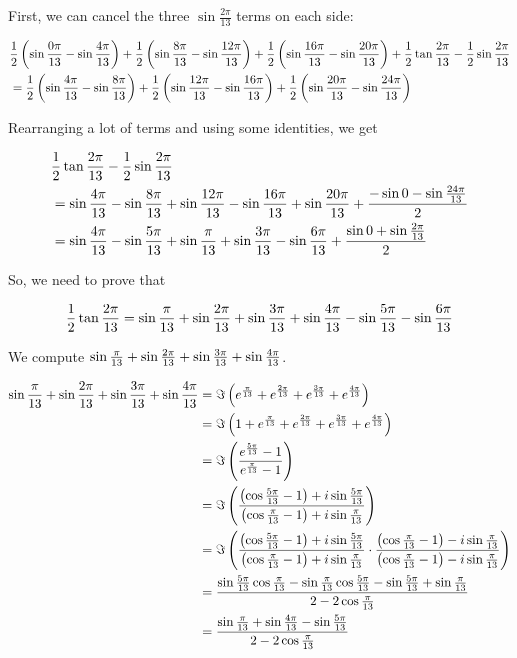 \documentclass[10pt]{../usamts}
\begin{document}
\begin{solution}{5}
First, we can cancel the three $\sin\frac{2\pi}{13}$ terms on each side:

\newcommand{\showsinsubtraction}[2] {
    \frac{1}{2}\paren{\sinthirteen{#1} - \sinthirteen{#2}}
}

\begin{align*}
    &\showsinsubtraction{0}{4} +
    \showsinsubtraction{8}{12} +
    \showsinsubtraction{16}{20} +
    \showtrianglebarea \\
    &=
    \showsinsubtraction{4}{8} +
    \showsinsubtraction{12}{16} +
    \showsinsubtraction{20}{24}
\end{align*}

Rearranging a lot of terms and using some identities, we get

\begin{align*}
    &\frac{1}{2} \tan{\frac{2\pi}{13}} - \frac{1}{2} \sin{\frac{2\pi}{13}} \\
    &= \sin{{\frac{4\pi}{13}}} - \sin{{\frac{8\pi}{13}}} + \sin{{\frac{12\pi}{13}}} - \sin{{\frac{16\pi}{13}}}
    + \sin{{\frac{20\pi}{13}}} + \frac{-\sin0 - \sin{{\frac{24\pi}{13}}}}{2} \\
    &= \sin{{\frac{4\pi}{13}}} - \sin{{\frac{5\pi}{13}}} + \sin{{\frac{\pi}{13}}} + \sin{{\frac{3\pi}{13}}}
    - \sin{{\frac{6\pi}{13}}} + \frac{\sin0 + \sin{{\frac{2\pi}{13}}}}{2}
\end{align*}

So, we need to prove that

\begin{equation}
    \frac{1}{2} \tan{{\frac{2\pi}{13}}}
    = \sin{{\frac{\pi}{13}}} + \sin{{\frac{2\pi}{13}}} + \sin{{\frac{3\pi}{13}}} + \sin{{\frac{4\pi}{13}}} - \sin{{\frac{5\pi}{13}}} - \sin{{\frac{6\pi}{13}}}
\end{equation}

We compute $\sin{{\frac{\pi}{13}}} + \sin{{\frac{2\pi}{13}}} + \sin{{\frac{3\pi}{13}}} + \sin{{\frac{4\pi}{13}}}$.

\begin{align*}
    \sin{{\frac{\pi}{13}}} + \sin{{\frac{2\pi}{13}}} + \sin{{\frac{3\pi}{13}}} + \sin{{\frac{4\pi}{13}}}
    &=\Im\left( e^{\frac{\pi}{13}} + e^{\frac{2\pi}{13}} + e^{\frac{3\pi}{13}} + e^{\frac{4\pi}{13}} \right) \\
    &= \Im\left( 1 + e^{\frac{\pi}{13}} + e^{\frac{2\pi}{13}} + e^{\frac{3\pi}{13}} + e^{\frac{4\pi}{13}} \right)\\
    &= \Im\left( \frac{e^{\frac{5\pi}{13}} - 1}{e^{\frac{\pi}{13}} - 1} \right) \\
    &= \Im\left( \frac{\left( \cos{{\frac{5\pi}{13}}}-1 \right) + i\sin{{\frac{5\pi}{13}}}}{\left( \cos{{\frac{\pi}{13}}}-1 \right) + i\sin{{\frac{\pi}{13}}}} \right) \\
    &= \Im\left( \frac{\left( \cos{{\frac{5\pi}{13}}}-1 \right) + i\sin{{\frac{5\pi}{13}}}}{\left( \cos{{\frac{\pi}{13}}}-1 \right) + i\sin{{\frac{\pi}{13}}}}
    \cdot \frac{\left( \cos{{\frac{\pi}{13}}}-1 \right) - i\sin{{\frac{\pi}{13}}}}{\left( \cos{{\frac{\pi}{13}}}-1 \right) - i\sin{{\frac{\pi}{13}}}} \right)\\
    &= \frac{\sin{{\frac{5\pi}{13}}}\cos{{\frac{\pi}{13}}}  - \sin{{\frac{\pi}{13}}}\cos{{\frac{5\pi}{13}}} - \sin{{\frac{5\pi}{13}}} + \sin{{\frac{\pi}{13}}}}
    {2 - 2\cos{{\frac{\pi}{13}}}} \\
    &= \frac{\sin{{\frac{\pi}{13}}} + \sin{{\frac{4\pi}{13}}} - \sin{{\frac{5\pi}{13}}}} {2 - 2\cos{{\frac{\pi}{13}}}}
\end{align*}


\end{solution}
\end{document}
